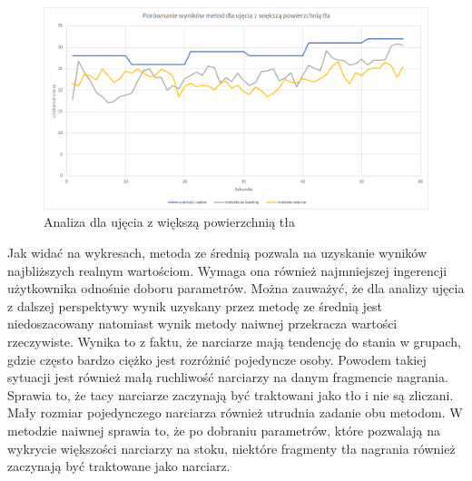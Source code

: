 \documentclass[a4paper]{article}
\begin{document}
\begin{figure}[H]
  \includegraphics[width=\linewidth]{resources/img10.png}
  \caption{Analiza dla ujęcia z większą powierzchnią tła}
\end{figure}

Jak widać na wykresach, metoda ze średnią pozwala na uzyskanie wyników najbliższych realnym wartościom. Wymaga ona również najmniejszej ingerencji użytkownika odnośnie doboru parametrów. Można zauważyć, że dla analizy ujęcia z dalszej perspektywy wynik uzyskany przez metodę ze średnią jest niedoszacowany natomiast wynik metody naiwnej przekracza wartości rzeczywiste. Wynika to z faktu, że narciarze mają tendencję do stania w grupach, gdzie często bardzo ciężko jest rozróżnić pojedyncze osoby. Powodem takiej sytuacji jest również małą ruchliwość narciarzy na danym fragmencie nagrania. Sprawia to, że tacy narciarze zaczynają być traktowani jako tło i nie są zliczani. Mały rozmiar pojedynczego narciarza również utrudnia zadanie obu metodom. W metodzie naiwnej sprawia to, że po dobraniu parametrów, które pozwalają na wykrycie większości narciarzy na stoku, niektóre fragmenty tła nagrania również zaczynają być traktowane jako narciarz.\\\\
\end{document}
